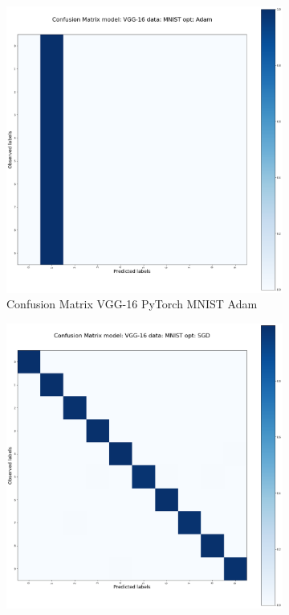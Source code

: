\documentclass[conference]{IEEEtran}
\begin{document}
\begin{figure}[!htbp]
    \centering
    \begin{subfigure}[b]{0.21\textwidth}
        \centering
        \includegraphics[width=\textwidth]{img/matrix_vgg_torch_mnist_adam.png}
        \caption{Confusion Matrix VGG-16 PyTorch MNIST Adam}
        \label{fig:x imatrix_GG-16_PyTorch_MNIST_Adam}
    \end{subfigure}
    \hfill
    \begin{subfigure}[b]{0.21\textwidth}
        \centering
        \includegraphics[width=\textwidth]{img/matrix_vgg_torch_MNIST_SGD.png}

\end{subfigure}
\end{figure}
\end{document}

